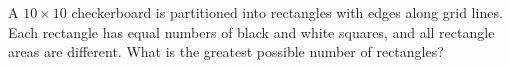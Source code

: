 A $10\times10$ checkerboard is partitioned into rectangles with edges along grid lines. Each rectangle has equal numbers of black and white squares, and all rectangle areas are different. What is the greatest possible number of rectangles?
